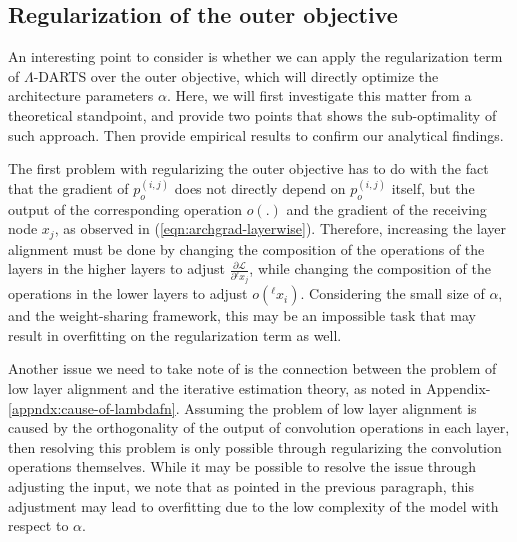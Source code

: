\documentclass{article} \usepackage{fancyhdr, iclr2023_conference, times}
\newcommand{\mydarts}{$\Lambda$-DARTS\xspace}
\newcommand{\lambdafn}{layer alignment\xspace}
\begin{document}
\subsection{Regularization of the outer objective}
\label{appndx:outer-obj}
\par An interesting point to consider is whether we can apply the regularization term of \mydarts over the outer objective, which will directly optimize the architecture parameters $\alpha$. Here, we will first investigate this matter from a theoretical standpoint, and provide two points that shows the sub-optimality of such approach. Then provide empirical results to confirm our analytical findings.
\par The first problem with regularizing the outer objective has to do with the fact that the gradient of $p_o^{(i, j)}$ does not directly depend on $p_o^{(i, j)}$ itself, but the output of the corresponding operation $o(.)$ and the gradient of the receiving node $x_j$, as observed in (\ref{eqn:archgrad-layerwise}). Therefore, increasing the \lambdafn must be done by changing the composition of the operations of the layers in the higher layers to adjust $\frac{\partial \mathcal{L}}{\partial {}^\ell x_j}$, while changing the composition of the operations in the lower layers to adjust $o({}^\ell x_i)$. Considering the small size of $\alpha$, and the weight-sharing framework, this may be an impossible task that may result in overfitting on the regularization term as well.
\par Another issue we need to take note of is the connection between the problem of low \lambdafn and the iterative estimation theory, as noted in Appendix-\ref{appndx:cause-of-lambdafn}. Assuming the problem of low \lambdafn is caused by the orthogonality of the output of convolution operations in each layer, then resolving this problem is only possible through regularizing the convolution operations themselves. While it may be possible to resolve the issue through adjusting the input, we note that as pointed in the previous paragraph, this adjustment may lead to overfitting due to the low complexity of the model with respect to $\alpha$.
\end{document}
